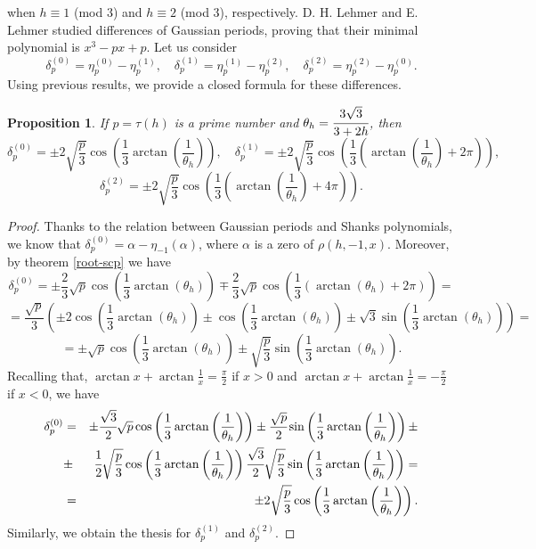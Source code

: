 \documentclass[12pt,reqno]{article}
\newtheorem{proposition}[theorem]{Proposition}
\begin{document}
\normalsize
when $h\equiv 1$ (mod $3$) and $h\equiv 2$ (mod $3$), respectively.
D. H. Lehmer and E. Lehmer \cite{project} studied differences of Gaussian periods, proving that their minimal polynomial is $x^3-px+p$. Let us consider
$$\delta_p^{(0)}=\eta_p^{(0)}-\eta_p^{(1)},\quad \delta_p^{(1)}=\eta_p^{(1)}-\eta_p^{(2)}, \quad \delta_p^{(2)}=\eta_p^{(2)}-\eta_p^{(0)}.$$
Using previous results, we provide a closed formula for these differences.
\begin{proposition}
If $p=\tau(h)$ is a prime number and $\theta_h=\cfrac{3\sqrt{3}}{3+2h}$, then
$$\delta_p^{(0)}=\pm2\sqrt{\frac{p}{3}}\cos \left(\frac{1}{3}\arctan\left( \frac{1}{\theta_h}\right) \right), \quad \delta_p^{(1)}=\pm2\sqrt{\frac{p}{3}}\cos \left(\frac{1}{3}\left(\arctan \left(\frac{1}{\theta_h}\right)+2\pi\right) \right),$$
$$\delta_p^{(2)}=\pm2\sqrt{\frac{p}{3}}\cos \left(\frac{1}{3}\left(\arctan\left( \frac{1}{\theta_h}\right)+4\pi\right) \right).$$
\end{proposition}
\begin{proof}
Thanks to the relation between Gaussian periods and Shanks polynomials, we know that $\delta_p^{(0)}=\alpha-\eta_{-1}(\alpha)$, where $\alpha$ is a zero of $\rho(h,-1,x)$. Moreover, by theorem \ref{root-scp} we have
$$\delta_p^{(0)}= \pm \frac{2}{3}\sqrt{p}\cos\left(\frac{1}{3}\arctan (\theta_h)\right)\mp \frac{2}{3}\sqrt{p}\cos\left(\frac{1}{3}\left(\arctan (\theta_h)+2\pi\right)\right)=$$
$$=\frac{\sqrt{p}}{3}\left(\pm2\cos\left(\frac{1}{3}\arctan (\theta_h)\right)\pm\cos\left(\frac{1}{3}\arctan (\theta_h)\right)\pm\sqrt{3}\sin\left(\frac{1}{3}\arctan( \theta_h)\right)\right)=$$
$$=\pm\sqrt{p}\cos\left(\frac{1}{3}\arctan (\theta_h)\right)\pm\sqrt{\frac{p}{3}}\sin\left(\frac{1}{3}\arctan (\theta_h)\right).$$
Recalling that, $\arctan x+ \arctan\frac{1}{x}=\frac{\pi}{2}$ if $x>0$ and $\arctan x+ \arctan\frac{1}{x}=-\frac{\pi}{2}$ if $x<0$, we have
\begin{eqnarray*}\delta_p^{(0)}&=&  \pm\cfrac{\sqrt{3}}{2}\sqrt{p}\cos \left(\frac{1}{3}\arctan\left( \frac{1}{\theta_h}\right)\right)\pm\cfrac{\sqrt{p}}{2}\sin \left(\frac{1}{3}\arctan\left( \frac{1}{\theta_h}\right)\right)\pm\\
                               &\pm&\cfrac{1}{2}\sqrt{\frac{p}{3}}\cos \left(\frac{1}{3}\arctan\left( \frac{1}{\theta_h}\right)\right)
\cfrac{\sqrt{3}}{2}\sqrt{\frac{p}{3}}\sin \left(\frac{1}{3}\arctan \left(\frac{1}{\theta_h}\right)\right)=\\
                               &=&\pm2\sqrt{\frac{p}{3}}\cos\left(\frac{1}{3}\arctan\left( \frac{1}{\theta_h}\right)\right).\end{eqnarray*}
Similarly, we obtain the thesis for $\delta_p^{(1)}$ and $\delta_p^{(2)}$.
\end{proof}
\end{document}
